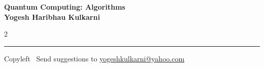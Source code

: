 \documentclass[8pt,landscape]{article}
\begin{document}
\footnotesize

\begin{center}
\Large{\textbf{Quantum Computing: Algorithms\\ Yogesh Haribhau Kulkarni}}
\end{center}

\begin{multicols}{2}

\end{multicols}

\rule{\linewidth}{0.25pt}
\scriptsize
Copyleft \textcopyleft\  Send suggestions to
\href{http://www.yogeshkulkarni.com}{yogeshkulkarni@yahoo.com}
\end{document}
